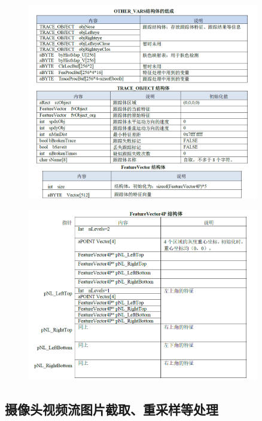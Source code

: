 \documentclass[12pt,hyperref,a4paper,UTF8]{ctexart}
\begin{document}
        \begin{figure}[H]
            \centering
            \includegraphics[width=0.9\textwidth]{./figures/fig/image3.png}
            \label{fig:your_image_label}
        \end{figure}
        \begin{figure}[H]
            \centering
            \includegraphics[width=0.9\textwidth]{./figures/fig/image4.png}
            \label{fig:your_image_label}
        \end{figure}



    \subsection{摄像头视频流图片截取、重采样等处理}
\end{document}
